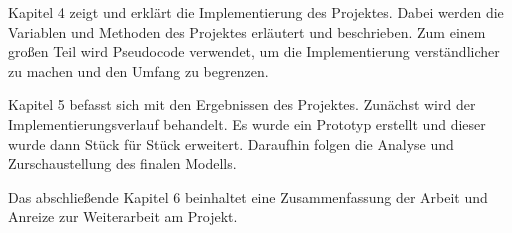 Kapitel 4 zeigt und erklärt die Implementierung des Projektes. Dabei werden die Variablen und Methoden des Projektes erläutert und beschrieben. Zum einem großen Teil wird Pseudocode verwendet, um die Implementierung verständlicher zu machen und den Umfang zu begrenzen.

Kapitel 5 befasst sich mit den Ergebnissen des Projektes. Zunächst wird der Implementierungsverlauf behandelt. Es wurde ein Prototyp erstellt und dieser wurde dann Stück für Stück erweitert. Daraufhin folgen die Analyse und Zurschaustellung des finalen Modells.

Das abschließende Kapitel 6 beinhaltet eine Zusammenfassung der Arbeit und Anreize zur Weiterarbeit am Projekt.
